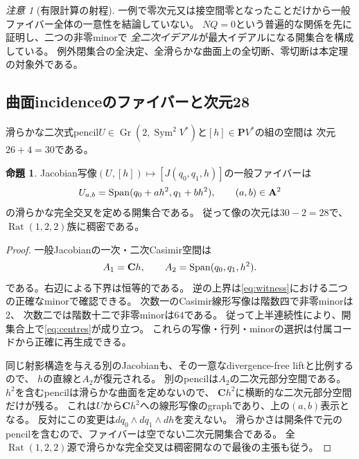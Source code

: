 \documentclass[a4paper,11pt]{ltjsarticle}
\theoremstyle{definition}
\newtheorem{proposition}[theorem]{命題}
\theoremstyle{definition}\newtheorem{definition}[theorem]{定義}
\theoremstyle{remark}\newtheorem{remark}[theorem]{注意}
\newcommand{\PP}{\mathbf P}\renewcommand{\AA}{\mathbf A}\newcommand{\CC}{\mathbf C}
\newcommand{\Rat}{\operatorname{Rat}}\newcommand{\Gr}{\operatorname{Gr}}
\begin{document}
\begin{remark}[有限計算の射程]
一例で零次元又は接空間零となったことだけから一般ファイバー全体の一意性を結論していない。
$NQ=0$という普遍的な関係を先に証明し、二つの非零minorで
\emph{全二次イデアル}が最大イデアルになる開集合を構成している。
例外閉集合の全決定、全滑らかな曲面上の全切断、零切断は本定理の対象外である。
\end{remark}

\subsection{曲面incidenceのファイバーと次元28}
滑らかな二次式pencil$U\in\Gr(2,\operatorname{Sym}^2V^*)$と$[h]\in\PP V^*$の組の空間は
次元$26+4=30$である。

\begin{proposition}\label{prop:dp-fibre}
Jacobian写像$(U,[h])\mapsto[J(q_0,q_1,h)]$の一般ファイバーは
\[
 U_{a,b}=\Span(q_0+ah^2,q_1+bh^2),\qquad (a,b)\in\AA^2
\]
の滑らかな完全交叉を定める開集合である。
従って像の次元は$30-2=28$で、$\Rat(1,2,2)$族に稠密である。
\end{proposition}
\begin{proof}
一般Jacobianの一次・二次Casimir空間は
\begin{equation}
 A_1=\CC h,\qquad A_2=\Span(q_0,q_1,h^2).              \label{eq:centres}
\end{equation}
である。右辺による下界は恒等的である。
逆の上界は\eqref{eq:witness}における二つの正確なminorで確認できる。
次数一のCasimir線形写像は階数四で非零minorは$2$、
次数二では階数十二で非零minorは$64$である。
従って上半連続性により、開集合上で\eqref{eq:centres}が成り立つ。
これらの写像・行列・minorの選択は付属コードから正確に再生成できる。

同じ射影構造を与える別のJacobianも、その一意なdivergence-free liftと比例するので、
$h$の直線と$A_2$が復元される。
別のpencilは$A_2$の二次元部分空間である。$h^2$を含むpencilは滑らかな曲面を定めないので、
$\CC h^2$に横断的な二次元部分空間だけが残る。
これは$U$から$\CC h^2$への線形写像のgraphであり、上の$(a,b)$表示となる。
反対にこの変更は$dq_0\wedge dq_1\wedge dh$を変えない。
滑らかさは開条件で元のpencilを含むので、ファイバーは空でない二次元開集合である。
全$\Rat(1,2,2)$源で滑らかな完全交叉は稠密開なので最後の主張も従う。
\end{proof}




\end{document}
